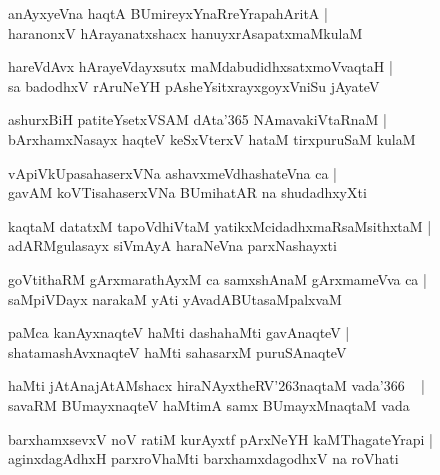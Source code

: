 \documentclass[twoside,12pt,openright]{book}
\def\S{\char'263}
\newcounter{shloka}[chapter]
\begin{document}
\begin{shloka}%
anAyxyeVna haqtA BUmireyxYnaRreYrapahAritA |\\
haranonxV hArayanatxshacx hanuyxrAsapatxmaMkulaM
\end{shloka}

\begin{shloka}%
hareVdAvx hArayeVdayxsutx maMdabudidhxsatxmoVvaqtaH |\\
sa badodhxV rAruNeYH pAsheYsitxrayxgoyxVniSu jAyateV
\end{shloka}

\begin{shloka}%
ashurxBiH patiteYsetxVSAM dAta\char'365  NAmavakiVtaRnaM |\\
bArxhamxNasayx haqteV keSxVterxV hataM tirxpuruSaM kulaM 
\end{shloka}

\begin{shloka}%
vApiVkUpasahaserxVNa ashavxmeVdhashateVna ca |\\
gavAM koVTisahaserxVNa BUmihatAR na shudadhxyXti
\end{shloka}

\begin{shloka}%
kaqtaM datatxM tapoVdhiVtaM yatikxMcidadhxmaRsaMsithxtaM |\\
adARMgulasayx siVmAyA haraNeVna parxNashayxti
\end{shloka}

\begin{shloka}%
goVtithaRM gArxmarathAyxM ca samxshAnaM gArxmameVva ca |\\
saMpiVDayx narakaM yAti yAvadABUtasaMpalxvaM
\end{shloka}

\begin{shloka}%
paMca kanAyxnaqteV haMti dashahaMti gavAnaqteV |\\
shatamashAvxnaqteV haMti sahasarxM puruSAnaqteV
\end{shloka}

\begin{shloka}%
haMti jAtAnajAtAMshacx hiraNAyxtheRV\S naqtaM vada\char'366 ~ |\\
savaRM BUmayxnaqteV haMtimA samx BUmayxMnaqtaM vada
\end{shloka}

\begin{shloka}%
barxhamxsevxV noV ratiM kurAyxtf pArxNeYH kaMThagateYrapi |\\
aginxdagAdhxH parxroVhaMti barxhamxdagodhxV na roVhati
\end{shloka}
\end{document}
